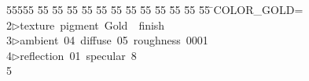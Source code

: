 %
%
\begin{tabbing}
55555 \= 55 \= 55 \= 55 \= 55 \= 55 \= 55 \= 55 \= 55 \= 55 \= 55 \= 55 \= 55 \= \>COLOR\_GOLD=\\[0pt]
2\>$\triangleright$\>texture\ pigment\ Gold\ \ finish\ \\[0pt]
3\>$\triangleright$\>ambient\ 04\ diffuse\ 05\ roughness\ 0001\ \\[0pt]
4\>$\triangleright$\>reflection\ 01\ specular\ 8\ \\[0pt]
5\>\end{tabbing}
